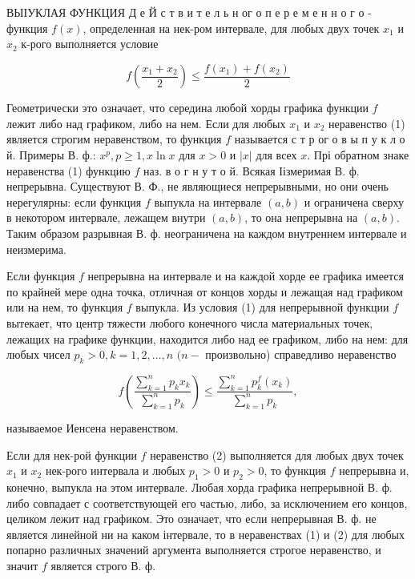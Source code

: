 \documentclass[10pt]{article}
\begin{document}
ВЫІУКЛАЯ ФУНКЦИЯ Д е Й с т в и т е л ь н ог о п е р е м е н н о г о - функция $f(x)$, определенная на нек-ром интервале, для любых двух точек $x_{1}$ и $x_{2}$ к-рого выполняется условие



\[

f\left(\frac{x_{1}+x_{2}}{2}\right) \leqslant \frac{f\left(x_{1}\right)+f\left(x_{2}\right)}{2}

\]



Геометрически это означает, что середина любой хорды графика функции $f$ лежит либо над графиком, либо на нем. Если для любых $x_{1}$ и $x_{2}$ неравенство (1) является строгим неравенством, то функция $f$ называется с т р ог о в ы $п$ у к л о й. Примеры В. ф.: $x^{p}, p \geqslant 1, x \ln x$ для $x>0$ и $|x|$ для всех $x$. Прі обратном знаке неравенства (1) функцию $f$ наз. в о г н у т о й. Всякая Іізмеримая В. ф. непрерывна. Существуют В. Ф., не являющиеся непрерывными, но они очень нерегулярны: если функция $f$ выпукла на интервале $(a, b)$ и ограничена сверху в некотором интервале, лежащем внутри $(a, b)$, то она непрерывна на $(a, b)$. Таким образом разрывная В. ф. неограничена на каждом внутреннем интервале и неизмерима.



Если функция $f$ непрерывна на интервале и на каждой хорде ее графика имеется по крайней мере одна точка, отличная от концов хорды и лежащая над графиком или на нем, то функция $f$ выпукла. Из условия (1) для непрерывной функции $f$ вытекает, что центр тяжести любого конечного числа материальных точек, лежащих на графике функции, находится либо над ее графиком, либо на нем: для любых чисел $p_{k}>0, k=1,2, \ldots, n$ $(n-$ произвольно) справедливо неравенство



\[

f\left(\frac{\sum_{k=1}^{n} p_{k} x_{k}}{\sum_{k=1}^{n} p_{k}}\right) \leqslant \frac{\sum_{k=1}^{n} p_{k}^{f}\left(x_{k}\right)}{\sum_{k=1}^{n} p_{k}},

\]



называемое Иенсена неравенством.



Если для нек-рой функции $f$ неравенство (2) выполняется для любых двух точек $x_{1}$ и $x_{2}$ нек-рого интервала и любых $p_{1}>0$ и $p_{2}>0$, то функция $f$ непрерывна и, конечно, выпукла на этом интервале. Любая хорда графика непрерывной В. ф. либо совпадает с соответствующей его частью, либо, за исключением его концов, целиком лежит над графиком. Это означает, что если непрерывная В. ф. не является линейной ни на каком інтервале, то в неравенствах (1) и (2) для любых попарно различных значений аргумента выполняется строгое неравенство, и значит $f$ является строго В. ф.
\end{document}
